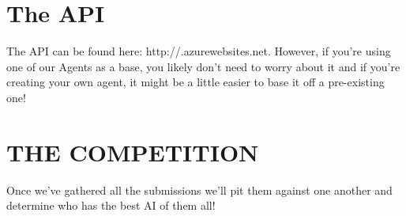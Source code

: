 \documentclass{article}
\begin{document}
\section*{The API}
The API can be found here: http://.azurewebsites.net. However, if you're using one of our Agents as a base, you likely don't need to worry about it and if you're creating your own agent, it might be a little easier to base it off a pre-existing one!

\section*{THE COMPETITION}
Once we've gathered all the submissions we'll pit them against one another and determine who has the best AI of them all!
\end{document}
